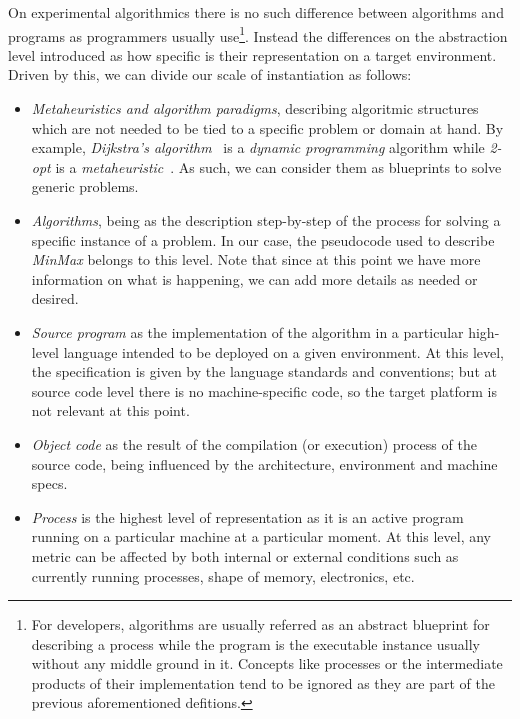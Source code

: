 On experimental algorithmics there is no such difference between algorithms and programs as programmers usually use\footnote{For developers, algorithms are usually referred as an abstract blueprint for describing a process while the program is the executable instance usually without any middle ground in it. Concepts like processes or the intermediate products of their implementation tend to be ignored as they are part of the previous aforementioned defitions.}. Instead the differences on the abstraction level introduced as how specific is their representation on a target environment. Driven by this, we can divide our scale of instantiation as follows:\\

\begin{itemize}
    \item \textit{Metaheuristics and algorithm paradigms}, describing algoritmic structures which are not needed to be tied to a specific problem or domain at hand. By example, \textit{Dijkstra's algorithm}~\cite{10.5555/1614191} is a \emph{dynamic programming} algorithm while \textit{2-opt} is a \emph{metaheuristic}~\cite{10.2307/167074}. As such, we can consider them as blueprints to solve generic problems.
    \item \textit{Algorithms}, being as the description step-by-step of the process for solving a specific instance of a problem. In our case, the pseudocode used to describe \textit{MinMax} belongs to this level. Note that since at this point we have more information on what is happening, we can add more details as needed or desired.
    \item \textit{Source program} as the implementation of the algorithm in a particular high-level language intended to be deployed on a given environment. At this level, the specification is given by the language standards and conventions; but at source code level there is no machine-specific code, so the target platform is not relevant at this point.
    \item \textit{Object code} as the result of the compilation (or execution) process of the source code, being influenced by the architecture, environment and machine specs.
    \item \textit{Process} is the highest level of representation as it is an active program running on a particular machine at a particular moment. At this level, any metric can be affected by both internal or external conditions such as currently running processes, shape of memory, electronics, etc.
\end{itemize}

